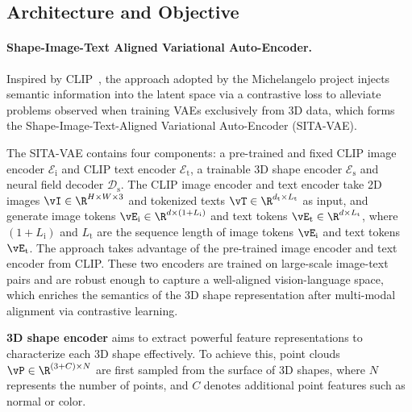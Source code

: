 \documentclass[../../book-main.tex]{subfiles}
\begin{document}
\subsection{Architecture and Objective}

\paragraph{Shape-Image-Text Aligned Variational Auto-Encoder.}

Inspired by CLIP~\cite{pmlr-v139-radford21a}, the approach adopted by
the Michelangelo project injects semantic information into the latent
space via a contrastive loss to alleviate problems observed when
training VAEs exclusively from 3D data, which forms the
Shape-Image-Text-Aligned Variational Auto-Encoder (SITA-VAE).

The SITA-VAE contains four components: a pre-trained and fixed CLIP image
encoder $\mathcal{E}_{\mathrm{i}}$ and CLIP text encoder
$\mathcal{E}_{\mathrm{t}}$, a trainable 3D shape encoder
$\mathcal{E}_{\mathrm{s}}$ and neural field decoder $\mathcal{D}_{\mathrm{s}}$.
The CLIP image encoder and text encoder take 2D images $\vI \in \R^{H \times
W \times 3}$ and tokenized texts $\vT \in \R^{d_{{\mathrm{t}}} \times
L_{\mathrm{t}}}$ as input, and generate image tokens
$\vE_{\mathrm{i}} \in \R^{d \times (1 + L_{\mathrm{i}})}$ and text
tokens $\vE_{\mathrm{t}} \in \R^{d \times L_{\mathrm{t}}}$, where
$(1+L_{\mathrm{i}})$ and $L_{\mathrm{t}}$ are the sequence length of
image tokens $\vE_{\mathrm{i}}$ and text tokens $\vE_{\mathrm{t}}$.
The approach takes advantage of the pre-trained image encoder and
text encoder from CLIP. These two encoders are trained on large-scale
image-text pairs and are robust enough to capture a well-aligned
vision-language space, which enriches the semantics of the 3D shape
representation after multi-modal alignment via contrastive learning.

\textbf{3D shape encoder} aims to extract powerful feature
representations to characterize each 3D shape effectively. To achieve
this, point clouds $\vP \in \R^{(3 + C) \times N}$ are first sampled
from the surface of 3D shapes, where $N$ represents the number of
points, and $C$ denotes additional point features such as normal or
color.
\end{document}
